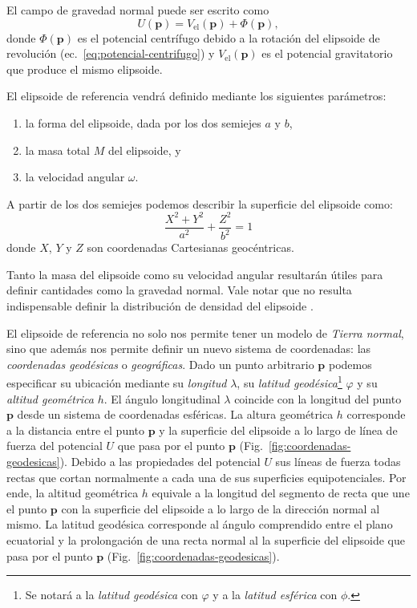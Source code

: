 El campo de gravedad normal puede ser escrito como
%
\begin{equation}
    U(\mathbf{p}) = V_\text{el}(\mathbf{p}) + \Phi(\mathbf{p}),
\end{equation}
%
donde $\Phi(\mathbf{p})$ es el potencial centrífugo debido a la
rotación del elipsoide de revolución (ec.~\ref{eq:potencial-centrifugo})
y $V_\text{el}(\mathbf{p})$ es el potencial gravitatorio que produce el mismo
elipsoide.

El elipsoide de referencia vendrá definido mediante los siguientes parámetros:
%
\begin{enumerate}
    \item{la forma del elipsoide, dada por los dos semiejes $a$ y $b$,}
    \item{la masa total $M$ del elipsoide, y}
    \item{la velocidad angular $\omega$.}
\end{enumerate}
%
A partir de los dos semiejes podemos describir la superficie del
elipsoide como:
%
\begin{equation}
    \frac{X^2 + Y^2}{a^2} + \frac{Z^2}{b^2} = 1
\end{equation}
%
donde $X$, $Y$ y $Z$ son coordenadas Cartesianas geocéntricas.

Tanto la masa del elipsoide como su velocidad angular resultarán útiles para
definir cantidades como la gravedad normal.
Vale notar que no resulta indispensable definir la distribución de densidad del
elipsoide \citep[][p.~64]{heiskanen1967}.

El elipsoide de referencia no solo nos permite tener un modelo de \emph{Tierra
normal}, sino que además nos permite definir un nuevo sistema de coordenadas:
las \emph{coordenadas geodésicas} o \emph{geográficas}.
Dado un punto arbitrario $\mathbf{p}$ podemos especificar su ubicación mediante
su \emph{longitud} $\lambda$, su
\emph{latitud geodésica}\footnote{%
    Se notará a la \emph{latitud geodésica} con $\varphi$ y a la \emph{latitud
    esférica} con $\phi$.
}
$\varphi$ y su \emph{altitud geométrica} $h$.
El ángulo longitudinal $\lambda$ coincide con la longitud del punto
$\mathbf{p}$ desde un sistema de coordenadas esféricas.
La altura geométrica $h$ corresponde a la distancia entre el punto $\mathbf{p}$
y la superficie del elipsoide a lo largo de línea de fuerza del potencial $U$
que pasa por el punto $\mathbf{p}$ (Fig.~\ref{fig:coordenadas-geodesicas}).
Debido a las propiedades del potencial $U$ sus líneas de fuerza todas
rectas que cortan normalmente a cada una de sus superficies equipotenciales.
Por ende, la altitud geométrica $h$ equivale a la longitud del segmento de
recta que une el punto $\mathbf{p}$ con la superficie del elipsoide a lo largo
de la dirección normal al mismo.
La latitud geodésica corresponde al ángulo comprendido entre el plano
ecuatorial y la prolongación de una recta normal al la superficie del elipsoide
que pasa por el punto $\mathbf{p}$ (Fig.~\ref{fig:coordenadas-geodesicas}).


